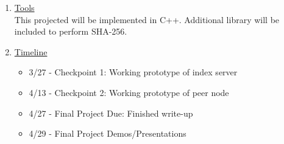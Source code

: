 \documentclass[12pt]{article}
\begin{document}
\begin{enumerate}
\item {\underline{Tools}} \\
This projected will be implemented in C++. Additional library will be included to perform SHA-256.

\item \underline{Timeline}
\begin{itemize}
\item 3/27 - Checkpoint 1: Working prototype of index server
\item 4/13 - Checkpoint 2: Working prototype of peer node
\item 4/27 - Final Project Due: Finished write-up
\item 4/29 - Final Project Demos/Presentations

\end{itemize}

\end{enumerate}
\end{document}
